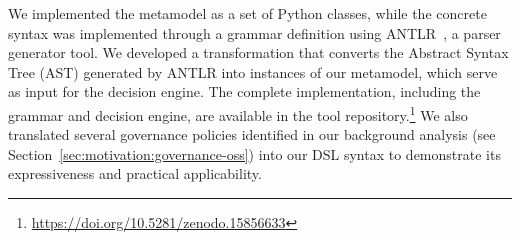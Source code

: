 We implemented the metamodel as a set of Python classes, while the concrete syntax was implemented through a grammar definition using ANTLR~\cite{ANTLRWEBSITE}, %
a parser generator tool.
We developed a transformation that converts the Abstract Syntax Tree (AST) generated by ANTLR into instances of our metamodel, which serve as input for the decision engine.
The complete implementation, including the grammar and decision engine, are available in the tool repository.\footnote{\url{https://doi.org/10.5281/zenodo.15856633}}
We also translated several governance policies identified in our background analysis (see Section~\ref{sec:motivation:governance-oss}) into our DSL syntax to demonstrate its expressiveness and practical applicability. 
